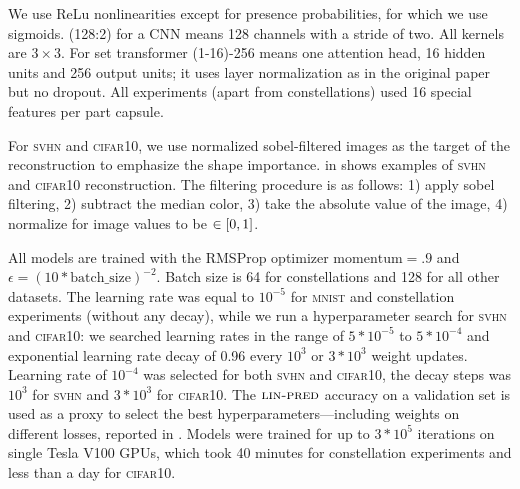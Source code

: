 We use ReLu nonlinearities except for presence probabilities, for which we use sigmoids.
(128:2) for a \gls{CNN} means 128 channels with a stride of two.
All kernels are $3\times3$.
For set transformer (1-16)-256 means one attention head, 16 hidden units and 256 output units; it uses layer normalization \citep{Ba2016LayerN} as in the original paper \citep{Lee2019set} but no dropout. All experiments (apart from constellations) used 16 special features per part capsule.

For \textsc{svhn} and \textsc{cifar10}, we use normalized sobel-filtered images as the target of the reconstruction to emphasize the shape importance.  in  shows examples of \textsc{svhn} and \textsc{cifar10} reconstruction.
The filtering procedure is as follows:
1) apply sobel filtering, 2) subtract the median color, 3) take the absolute value of the image, 4) normalize for image values to be $\in {\left[0, 1\right]}$.

All models are trained with the RMSProp optimizer \citep{tieleman2012rms} $\mathrm{momentum}=.9$ and $\epsilon = \left(10 * \mathrm{batch\_size}\right)^{-2}$.
Batch size is 64 for constellations and 128 for all other datasets.
The learning rate was equal to $10^{-5}$ for \textsc{mnist} and constellation experiments (without any decay), while we run a hyperparameter search for \textsc{svhn} and \textsc{cifar10}: we searched learning rates in the range of $5*10^{-5}$ to $5*10^{-4}$ and exponential learning rate decay of 0.96 every $10^3$ or $3*10^3$ weight updates. Learning rate of $10^{-4}$ was selected for both \textsc{svhn} and \textsc{cifar10}, the decay steps was $10^3$ for \textsc{svhn} and $3*10^3$ for \textsc{cifar10}.
The $\textsc{lin-pred}$ accuracy on a validation set is used as a proxy to select the best hyperparameters---including weights on different losses, reported in .
Models were trained for up to $3*10^5$ iterations on single Tesla V100 GPUs, which took 40 minutes for constellation experiments and less than a day for \textsc{cifar10}.

